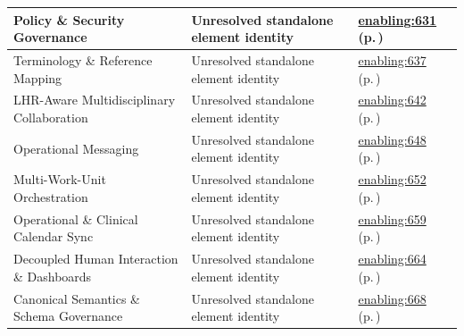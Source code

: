 \begin{longtable}{|>{\raggedright\arraybackslash}p{0.38\TableWidth}|>{\raggedright\arraybackslash}p{0.27\TableWidth}|>{\raggedright\arraybackslash}p{0.35\TableWidth}|}
Policy \& Security Governance & Unresolved standalone element identity & \hyperref[rad:enabling:631]{enabling:631} (p.\,\pageref{rad:enabling:631})\\\hline
Terminology \& Reference Mapping & Unresolved standalone element identity & \hyperref[rad:enabling:637]{enabling:637} (p.\,\pageref{rad:enabling:637})\\\hline
LHR-Aware Multidisciplinary Collaboration & Unresolved standalone element identity & \hyperref[rad:enabling:642]{enabling:642} (p.\,\pageref{rad:enabling:642})\\\hline
Operational Messaging & Unresolved standalone element identity & \hyperref[rad:enabling:648]{enabling:648} (p.\,\pageref{rad:enabling:648})\\\hline
Multi-Work-Unit Orchestration & Unresolved standalone element identity & \hyperref[rad:enabling:652]{enabling:652} (p.\,\pageref{rad:enabling:652})\\\hline
Operational \& Clinical Calendar Sync & Unresolved standalone element identity & \hyperref[rad:enabling:659]{enabling:659} (p.\,\pageref{rad:enabling:659})\\\hline
Decoupled Human Interaction \& Dashboards & Unresolved standalone element identity & \hyperref[rad:enabling:664]{enabling:664} (p.\,\pageref{rad:enabling:664})\\\hline
Canonical Semantics \& Schema Governance & Unresolved standalone element identity & \hyperref[rad:enabling:668]{enabling:668} (p.\,\pageref{rad:enabling:668})\\\hline
\end{longtable}\endgroup
